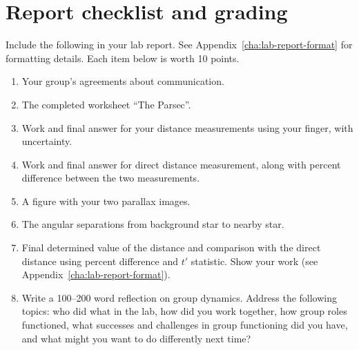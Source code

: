 \section{Report checklist and grading}

Include the following in your lab report. See Appendix~\ref{cha:lab-report-format} for formatting details. Each item below is worth 10 points.

\begin{enumerate}
	\item Your group's agreements about communication.
	\item The completed worksheet ``The Parsec''.
	\item Work and final answer for your distance measurements using your finger, with uncertainty.
	\item Work and final answer for direct distance measurement, along with percent difference between the two measurements.
	\item A figure with your two parallax images.
	\item The angular separations from background star to nearby star.
	\item Final determined value of the distance and comparison with the direct distance using percent difference and $t'$ statistic. Show your work (see Appendix~\ref{cha:lab-report-format}).
	\item Write a 100--200 word reflection on group dynamics. Address the following topics: who did what in the lab, how did you work together, how group roles functioned, what successes and challenges in group functioning did you have, and what might you want to do differently next time?
\end{enumerate}
